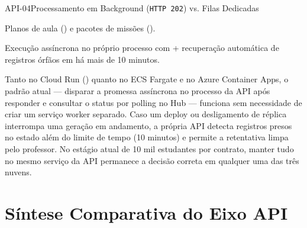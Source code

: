 \begin{pecaarq}{API-04}{Processamento em Background (\texttt{HTTP 202}) vs. Filas Dedicadas}{\sgcp~\nativo\enspace\saws~\equivalente\enspace\sazure~\nativo}
\begin{campos}
  \item[Fluxos na API] Planos de aula () e pacotes de missões ().
  \item[Mecanismo atual] Execução assíncrona no próprio processo com  + recuperação automática de registros órfãos em  há mais de 10 minutos.
  \item[Análise nos 3 provedores] Tanto no Cloud Run () quanto no ECS Fargate e no Azure Container Apps, o padrão atual --- disparar a promessa assíncrona no processo da API após responder  e consultar o status por polling no Hub --- funciona sem necessidade de criar um serviço worker separado. Caso um deploy ou desligamento de réplica interrompa uma geração em andamento, a própria API detecta registros presos no estado  além do limite de tempo (10 minutos) e permite a retentativa limpa pelo professor. No estágio atual de 10 mil estudantes por contrato, manter tudo no mesmo serviço da API permanece a decisão correta em qualquer uma das três nuvens.
\end{campos}
\end{pecaarq}

\section{Síntese Comparativa do Eixo API}

